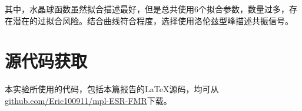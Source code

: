 \documentclass{thuemp}
\begin{document}
其中，水晶球函数虽然拟合描述最好，但是总共使用6个拟合参数，数量过多，存在潜在的过拟合风险。结合曲线符合程度，选择使用洛伦兹型峰描述共振信号。



\section{源代码获取}

本实验所使用的代码，包括本篇报告的\LaTeX 源码，均可从\url{github.com/Eric100911/mpl-ESR-FMR}下载。
\end{document}
